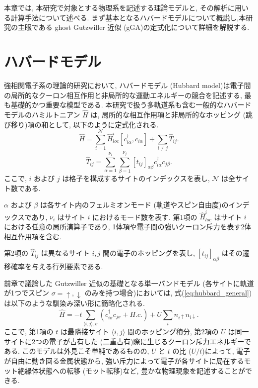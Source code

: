 
本章では, 本研究で対象とする物理系を記述する理論モデルと, その解析に用いる計算手法について述べる. まず基本となるハバードモデルについて概説し,本研究の主眼である ghost Gutzwiller 近似 (gGA)の定式化について詳細を解説する. 

\section{ハバードモデル}

強相関電子系の理論的研究において, ハバードモデル (Hubbard model)は電子間の局所的なクーロン相互作用と非局所的な運動エネルギーの競合を記述する, 最も基礎的かつ重要な模型である. 
本研究で扱う多軌道系も含む一般的なハバードモデルのハミルトニアン $\hat{H}$ は, 局所的な相互作用項と非局所的なホッピング (跳び移り)項の和として, 以下のように定式化される.
\begin{equation}
    \hat{H} = \sum_{i=1}^{\mathcal{N}} \hat{H}_{loc}^i[c_{i\alpha}^\dagger, c_{i\alpha}] + \sum_{i \neq j} \hat{T}_{ij}.
    \label{eq:hubbard_general}
\end{equation}
\begin{equation}
    \hat{T}_{ij} = \sum_{\alpha=1}^{\nu_i} \sum_{\beta=1}^{\nu_j} [t_{ij}]_{\alpha\beta} c_{i\alpha}^\dagger c_{j\beta}.
    \label{eq:hopping_general}
\end{equation}
ここで, $i$ および $j$ は格子を構成するサイトのインデックスを表し, $\mathcal{N}$ は全サイト数である. 

$\alpha$ および $\beta$ は各サイト内のフェルミオンモード (軌道やスピン自由度)のインデックスであり, $\nu_i$ はサイト $i$ におけるモード数を表す. 
第1項の $\hat{H}_{loc}^i$ はサイト $i$ における任意の局所演算子であり, 1体項や電子間の強いクーロン斥力を表す2体相互作用項を含む. 

第2項の $\hat{T}_{ij}$ は異なるサイト $i, j$ 間の電子のホッピングを表し, $[t_{ij}]_{\alpha\beta}$ はその遷移確率を与える行列要素である. 

前章で議論した Gutzwiller 近似の基礎となる単一バンドモデル (各サイトに軌道が1つでスピン $\sigma = \uparrow, \downarrow$ のみを持つ場合)においては, 式(\ref{eq:hubbard_general})は以下のような馴染み深い形に簡略化される.
\begin{equation}
    \hat{H} = -t \sum_{\langle i,j \rangle, \sigma} \left( c_{i\sigma}^\dagger c_{j\sigma} + H.c. \right)+ U \sum_i n_{i\uparrow} n_{i\downarrow}.
    \label{eq:hubbard_single}
\end{equation}
ここで, 第1項の $t$ は最隣接サイト $\langle i,j \rangle$ 間のホッピング積分, 第2項の $U$ は同一サイトに2つの電子が占有した (二重占有)際に生じるクーロン斥力エネルギーである. 
このモデルは外見こそ単純であるものの, $U$ と $t$ の比 ($U/t$)によって, 電子が自由に動き回る金属状態から, 強い斥力によって電子が各サイトに局在するモット絶縁体状態への転移 (モット転移)など, 豊かな物理現象を記述することができる. 

